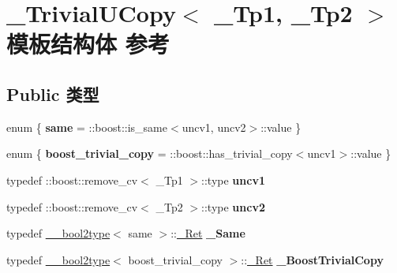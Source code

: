 \hypertarget{struct___trivial_u_copy}{}\section{\+\_\+\+Trivial\+U\+Copy$<$ \+\_\+\+Tp1, \+\_\+\+Tp2 $>$ 模板结构体 参考}
\label{struct___trivial_u_copy}
\subsection*{Public 类型}
\begin{DoxyCompactItemize}
\item 
\mbox{\label{struct___trivial_u_copy_a8802abd0a5fc28fe10a882206db99733}} 
enum \{ {\bfseries same} = \+:\+:boost\+:\+:is\+\_\+same$<$uncv1, uncv2$>$\+:\+:value
 \}
\item 
\mbox{\label{struct___trivial_u_copy_a344329aa77ad640720b4f1868f9fa65e}} 
enum \{ {\bfseries boost\+\_\+trivial\+\_\+copy} = \+:\+:boost\+:\+:has\+\_\+trivial\+\_\+copy$<$uncv1$>$\+:\+:value
 \}
\item 
\mbox{\label{struct___trivial_u_copy_aca6c34532d24200a7f5481e26c63442d}} 
typedef \+::boost\+::remove\+\_\+cv$<$ \+\_\+\+Tp1 $>$\+::type {\bfseries uncv1}
\item 
\mbox{\label{struct___trivial_u_copy_aba74e6d8cb098e1302eb304786028973}} 
typedef \+::boost\+::remove\+\_\+cv$<$ \+\_\+\+Tp2 $>$\+::type {\bfseries uncv2}
\item 
\mbox{\label{struct___trivial_u_copy_aaa4e1c09ee53843f38c5d133892db279}} 
typedef \hyperlink{struct____bool2type}{\+\_\+\+\_\+bool2type}$<$ same $>$\+::\hyperlink{struct____true__type}{\+\_\+\+Ret} {\bfseries \+\_\+\+Same}
\item 
\mbox{\label{struct___trivial_u_copy_aaa1dfafd92bfdefb2751b52b2d5ac93a}} 
typedef \hyperlink{struct____bool2type}{\+\_\+\+\_\+bool2type}$<$ boost\+\_\+trivial\+\_\+copy $>$\+::\hyperlink{struct____true__type}{\+\_\+\+Ret} {\bfseries \+\_\+\+Boost\+Trivial\+Copy}
\item 

\end{DoxyCompactItemize}
